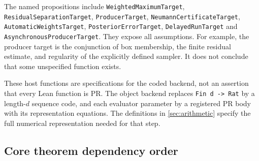 The named propositions include
\nolinkurl{WeightedMaximumTarget}, \nolinkurl{ResidualSeparationTarget},
\nolinkurl{ProducerTarget}, \nolinkurl{NeumannCertificateTarget},
\nolinkurl{AutomaticWeightsTarget}, \nolinkurl{PosteriorErrorTarget},
\nolinkurl{DelayedRunTarget} and \nolinkurl{AsynchronousProducerTarget}.
They expose all assumptions. For example, the producer target is
the conjunction of box membership, the finite residual estimate,
and regularity of the explicitly defined sampler. It does not
conclude that some unspecified function exists.

These host functions are specifications for the coded backend, not
an assertion that every Lean function is PR. The object backend
replaces \texttt{Fin d -> Rat} by a length-\(d\) sequence code,
and each evaluator parameter by a registered PR body with its
representation equations. The definitions in \cref{sec:arithmetic}
specify the full numerical representation needed for that step.

\clearpage
\subsection{Core theorem dependency order}

